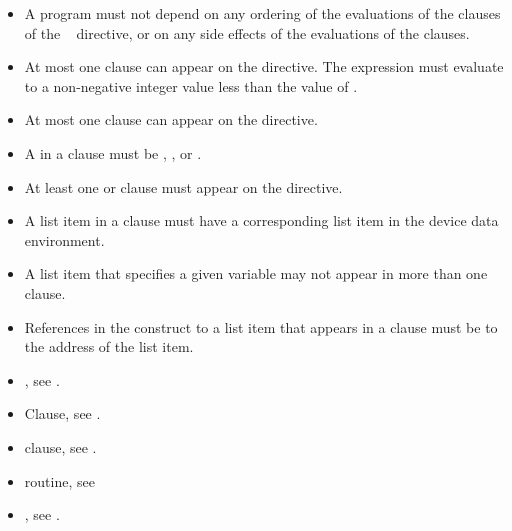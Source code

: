 \restrictions
\begin{itemize}
    \item A program must not depend on any ordering of the evaluations of the clauses of the
    ~ directive, or on any side effects of the evaluations of the clauses.

  \item At most one  clause can appear on the directive. The  expression
    must evaluate to a non-negative integer value less than the value
    of .

  \item At most one  clause can appear on the directive.
  \item A  in a  clause must be , ,  or .
  \item At least one  or  clause must appear on the directive.


  \item A list item in a  clause must have a
    corresponding list item in the device data environment.

  \item A list item that specifies a given variable may not appear in more than
	  one  clause.

  \item References in the construct to a list item that appears in a
     clause must be to the address of the list item.

\end{itemize}


\crossreferences
\begin{itemize}
\item {}, see
.

\item {} Clause, see .

\item {} clause, see
.

\item {} routine, see 

\item {}, see
.

\end{itemize}










